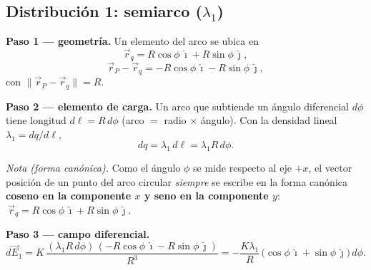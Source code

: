 \documentclass[12pt,letterpaper]{article}
\newcommand{\ii}{\hat{\imath}}
\newcommand{\jj}{\hat{\jmath}}
\begin{document}
\subsection*{Distribuci\'on 1: semiarco ($\lambda_1$)}

\noindent
\begin{minipage}[c]{0.32\textwidth}
\centering
{}
\end{minipage}%
\hfill
\begin{minipage}[c]{0.64\textwidth}
\textbf{Paso 1 — geometr\'ia.} Un elemento del arco se ubica en
\[
    \vec{r}_q = R\cos\phi\,\ii + R\sin\phi\,\jj,
\]
\[
    \vec{r}_P - \vec{r}_q = -R\cos\phi\,\ii - R\sin\phi\,\jj,
\]
con $\lVert \vec{r}_P - \vec{r}_q\rVert = R$.

\smallskip
\textbf{Paso 2 — elemento de carga.} Un arco que subtiende un \'angulo diferencial $d\phi$ tiene
longitud $d\ell = R\,d\phi$ (arco $=$ radio $\times$ \'angulo). Con la densidad lineal
$\lambda_1 = dq/d\ell$,
\[
    dq = \lambda_1\,d\ell = \lambda_1 R\,d\phi.
\]
\end{minipage}

\smallskip
\noindent\textit{Nota (forma can\'onica).} Como el \'angulo $\phi$ se mide respecto al eje $+x$, el
vector posici\'on de un punto del arco circular \emph{siempre} se escribe en la forma can\'onica
\textbf{coseno en la componente $x$ y seno en la componente $y$}:
$\ \vec{r}_q = R\cos\phi\,\ii + R\sin\phi\,\jj$.

\noindent\textbf{Paso 3 — campo diferencial.}
\[
    d\vec{E}_1 = K\,\frac{(\lambda_1 R\,d\phi)\,(-R\cos\phi\,\ii - R\sin\phi\,\jj)}{R^{3}}
    = -\frac{K\lambda_1}{R}\,\big(\cos\phi\,\ii + \sin\phi\,\jj\big)\,d\phi.
\]
\end{document}
